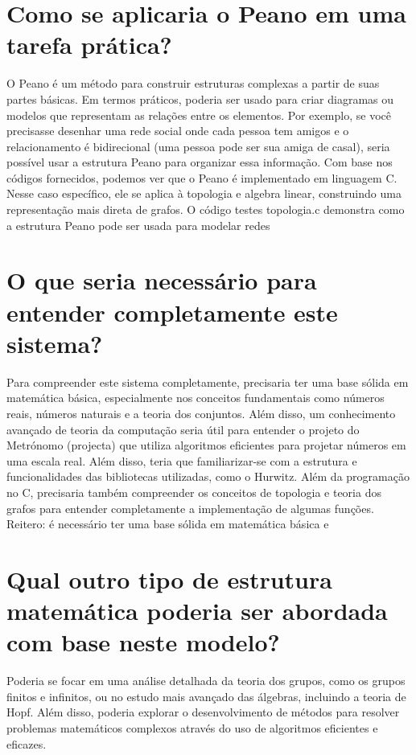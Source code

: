 \documentclass[11pt,a4paper]{article}
\begin{document}
\section{Como se aplicaria o Peano em uma tarefa prática?}
O Peano é um método para construir estruturas complexas a partir de suas partes básicas. Em termos práticos, poderia ser usado para criar diagramas ou modelos que representam as relações entre os elementos. Por exemplo, se você precisasse desenhar uma rede social onde cada pessoa tem amigos e o relacionamento é bidirecional (uma pessoa pode ser sua amiga de casal), seria possível usar a estrutura Peano para organizar essa informação. Com base nos códigos fornecidos, podemos ver que o Peano é implementado em linguagem C. Nesse caso específico, ele se aplica à topologia e algebra linear, construindo uma representação mais direta de grafos. O código testes topologia.c demonstra como a estrutura Peano pode ser usada para modelar redes

\section{O que seria necessário para entender completamente este sistema?}
Para compreender este sistema completamente, precisaria ter uma base sólida em matemática básica, especialmente nos conceitos fundamentais como números reais, números naturais e a teoria dos conjuntos. Além disso, um conhecimento avançado de teoria da computação seria útil para entender o projeto do Metrónomo (projecta) que utiliza algoritmos eficientes para projetar números em uma escala real. Além disso, teria que familiarizar-se com a estrutura e funcionalidades das bibliotecas utilizadas, como o Hurwitz. Além da programação no C, precisaria também compreender os conceitos de topologia e teoria dos grafos para entender completamente a implementação de algumas funções. Reitero: é necessário ter uma base sólida em matemática básica e

\section{Qual outro tipo de estrutura matemática poderia ser abordada com base neste modelo?}
Poderia se focar em uma análise detalhada da teoria dos grupos, como os grupos finitos e infinitos, ou no estudo mais avançado das álgebras, incluindo a teoria de Hopf. Além disso, poderia explorar o desenvolvimento de métodos para resolver problemas matemáticos complexos através do uso de algoritmos eficientes e eficazes.
\end{document}

